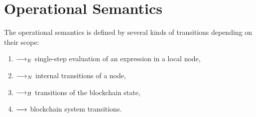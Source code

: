 \documentclass[runningheads]{llncs}
\begin{document}
\section{Operational Semantics}
\label{sec:transitions}

The operational semantics is defined by several kinds of transitions depending on their scope:
\begin{enumerate}
\item $\stackrel{{}}\longrightarrow_E$ single-step evaluation of an expression in a local node,
\item $\stackrel{{}}\longrightarrow_N$ internal transitions of a node,
\item $\stackrel{{}}\longrightarrow_B$ transitions of the blockchain state,
\item $\longrightarrow$ blockchain system transitions.
\end{enumerate}
\end{document}
